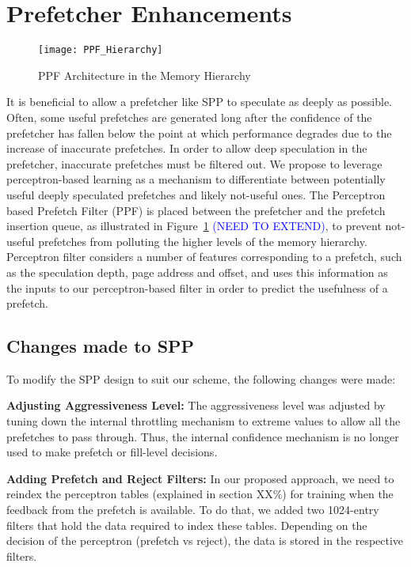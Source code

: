 \section{Prefetcher Enhancements}
\label{Enhancements}

\begin{figure}
  \begin{center}
  \texttt{[image: PPF\_Hierarchy]}
  \caption{PPF Architecture in the Memory Hierarchy}
  \label{fig:PPF_Hierarchy}
  \end{center}
\end{figure}

It is beneficial to allow a prefetcher like SPP to speculate as 
deeply as possible. Often, some useful prefetches are generated long 
after the confidence of the prefetcher has fallen below the point at 
which performance degrades due to the increase of inaccurate prefetches.  
In order to allow deep speculation in the prefetcher, inaccurate
prefetches must be filtered out. We propose to leverage
perceptron-based learning as a mechanism to differentiate between
potentially useful deeply speculated prefetches and likely not-useful
ones. The Perceptron based Prefetch Filter (PPF) is placed between the
prefetcher and the prefetch insertion queue, as illustrated in
Figure~\ref{fig:PPF_Hierarchy} \textcolor{blue}{(NEED TO EXTEND)}, 
to prevent not-useful prefetches from polluting the higher levels 
of the memory hierarchy. Perceptron filter considers a number of 
features corresponding to a prefetch, such as the speculation depth, 
page address and offset, and uses this information as the inputs to our 
perceptron-based filter in order to predict the usefulness of a prefetch.  

\subsection{Changes made to SPP}
\label{Enhancements-SPP}
To modify the SPP design to suit our scheme, the following changes
were made:

\noindent \textbf{Adjusting Aggressiveness Level:}
The aggressiveness level was adjusted by tuning down the internal throttling
mechanism to extreme values to allow all the prefetches to pass through. Thus,
the internal confidence mechanism is no longer used to make prefetch or
fill-level decisions.

\noindent \textbf{Adding Prefetch and Reject Filters:}
In our proposed approach, we need to reindex the perceptron tables (explained in
section XX\%) for training when the feedback from the prefetch is available.
To do that, we added two 1024-entry filters that hold the data required to index
these tables. Depending on the decision of the perceptron (prefetch vs reject), the
data is stored in the respective filters.

